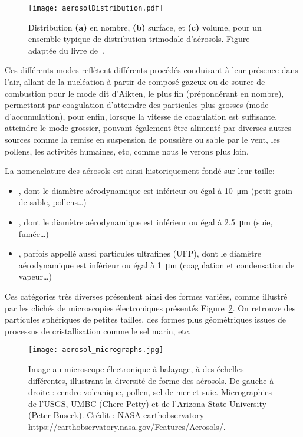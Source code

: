 \begin{figure}[ht]
    \centering
    \texttt{[image: aerosolDistribution.pdf]}
    \caption{Distribution \textbf{(a)} en nombre, \textbf{(b)} surface, et
        \textbf{(c)} volume, pour un ensemble typique de distribution trimodale
        d'aérosols. Figure adaptée du livre de~\textcite{seinfieldAtmospheric1998}.}
    \label{fig:aerosolDistribution}
\end{figure}

Ces différents modes reflètent différents procédés conduisant à leur présence dans l'air,
allant de la nucléation à partir de composé gazeux ou de source de combustion pour le mode
dit d'Aikten, le plus fin (prépondérant en nombre), permettant par coagulation d'atteindre
des particules plus grosses (mode d'accumulation), pour enfin, lorsque la vitesse de
coagulation est suffisante, atteindre le mode grossier, pouvant également être alimenté
par diverses autres sources comme la remise en suspension de poussière ou sable par le
vent, les pollens, les activités humaines, etc, comme nous le verons plus loin.

La nomenclature des aérosols est ainsi historiquement fondé sur leur taille:
\begin{itemize}
    \item \PMdix, dont le diamètre aérodynamique est inférieur ou égal à \SI{10}{\um} (petit
        grain de sable, pollens…)
    \item \PMdc, dont le diamètre aérodynamique est inférieur ou égal à \SI{2.5}{\um}
        (suie, fumée…)
    \item \PMun, parfois appellé aussi particules ultrafines (UFP), dont le diamètre
        aérodynamique est inférieur ou égal à \SI{1}{\um} (coagulation et condensation de
        vapeur…)
\end{itemize}


Ces catégories très diverses présentent ainsi des formes variées, comme illustré par les
clichés de microscopies électroniques présentés Figure~\ref{fig:micrography}. On retrouve
des particules sphériques de petites tailles, des formes plus géométriques issues de
processus de cristallisation comme le sel marin, etc.

\begin{figure}[ht]
    \centering
    \texttt{[image: aerosol\_micrographs.jpg]}
    \caption{Image au microscope électronique à balayage, à des échelles différentes,
        illustrant la diversité de forme des aérosols.
        De gauche à droite : cendre volcanique, pollen, sel de mer et suie. Micrographies de
        l'USGS, UMBC (Chere Petty) et de l'Arizona State University (Peter Buseck). 
        Crédit : NASA earthobservatory \url{https://earthobservatory.nasa.gov/Features/Aerosols/}.
    }
    \label{fig:micrography}
\end{figure}

